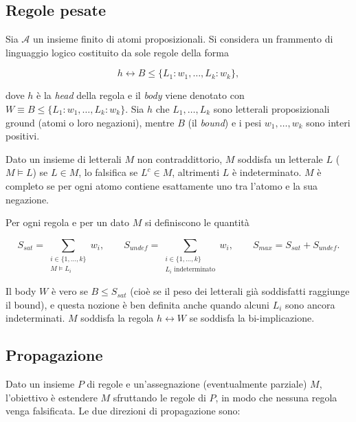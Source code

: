 \documentclass[11pt,a4paper]{article}
\begin{document}
\subsection{Regole pesate}

Sia $\mathcal{A}$ un insieme finito di atomi proposizionali. Si considera un frammento di
linguaggio logico costituito da sole regole della forma

\begin{equation}
h \leftrightarrow B \le \{L_1 : w_1, \dots, L_k : w_k\},
\label{eq:rule}
\end{equation}

dove $h$ è la \emph{head} della regola e il \emph{body} viene denotato con
$W \equiv B \le \{L_1:w_1,\dots,L_k:w_k\}$. Sia $h$ che $L_1,\dots,L_k$ sono letterali
proposizionali ground (atomi o loro negazioni), mentre $B$ (il \emph{bound}) e i pesi
$w_1,\dots,w_k$ sono interi positivi.

Dato un insieme di letterali $M$ non contraddittorio, $M$ soddisfa un letterale $L$ ($M \models
L$) se $L \in M$, lo falsifica se $L^c \in M$, altrimenti $L$ è indeterminato. $M$ è completo se
per ogni atomo contiene esattamente uno tra l'atomo e la sua negazione.

Per ogni regola e per un dato $M$ si definiscono le quantità

\[
S_{sat} = \sum_{\substack{i \in \{1,\dots,k\}\\ M \models L_i}} w_i, \qquad
S_{undef} = \sum_{\substack{i \in \{1,\dots,k\}\\ L_i \text{ indeterminato}}} w_i, \qquad
S_{max} = S_{sat} + S_{undef}.
\]

Il body $W$ è vero se $B \le S_{sat}$ (cioè se il peso dei letterali già soddisfatti raggiunge il
bound), e questa nozione è ben definita anche quando alcuni $L_i$ sono ancora indeterminati. $M$
soddisfa la regola $h \leftrightarrow W$ se soddisfa la bi-implicazione.

\subsection{Propagazione}

Dato un insieme $P$ di regole e un'assegnazione (eventualmente parziale) $M$, l'obiettivo è
estendere $M$ sfruttando le regole di $P$, in modo che nessuna regola venga falsificata. Le due
direzioni di propagazione sono:
\end{document}

